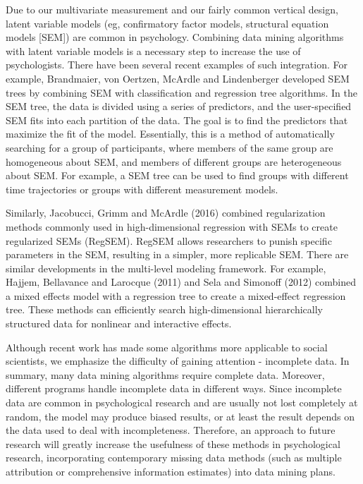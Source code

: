 Due to our multivariate measurement and our fairly common vertical
 design, latent variable models (eg, confirmatory factor models, 
structural equation models [SEM]) are common in psychology. 
Combining data mining algorithms with latent variable models is a 
necessary step to increase the use of psychologists. There have 
been several recent examples of such integration. For example, 
Brandmaier, von Oertzen, McArdle and Lindenberger\cite{editor11} developed 
SEM trees by combining SEM with classification and regression 
tree algorithms. In the SEM tree, the data is divided using a 
series of predictors, and the user-specified SEM fits into each 
partition of the data. The goal is to find the predictors that 
maximize the fit of the model. Essentially, this is a method of 
automatically searching for a group of participants, where members
 of the same group are homogeneous about SEM, and members of 
different groups are heterogeneous about SEM\cite{editor11}. 
For example, a SEM tree can be used to
 find groups with different time trajectories or groups with 
different measurement models.

Similarly, Jacobucci, Grimm and McArdle (2016) combined 
regularization methods commonly used in high-dimensional regression
 with SEMs to create regularized SEMs (RegSEM). RegSEM allows 
researchers to punish specific parameters in the SEM, resulting in
 a simpler, more replicable SEM. There are similar developments in
 the multi-level modeling framework. For example, Hajjem, 
Bellavance and Larocque (2011) and Sela and Simonoff (2012) combined
 a mixed effects model with a regression tree to create a 
mixed-effect regression tree. These methods can efficiently search
 high-dimensional hierarchically structured data for nonlinear and
 interactive effects\cite{editor11}.

Although recent work has made some algorithms more applicable to 
social scientists, we emphasize the difficulty of gaining 
attention - incomplete data. In summary, many data mining 
algorithms require complete data. Moreover, different programs 
handle incomplete data in different ways. Since incomplete data are
 common in psychological research and are usually not lost 
completely at random, the model may produce biased results, or at 
least the result depends on the data used to deal with 
incompleteness. Therefore, an approach to future research will 
greatly increase the usefulness of these methods in psychological 
research, incorporating contemporary missing data methods (such as
 multiple attribution or comprehensive information estimates) into
 data mining plans.


